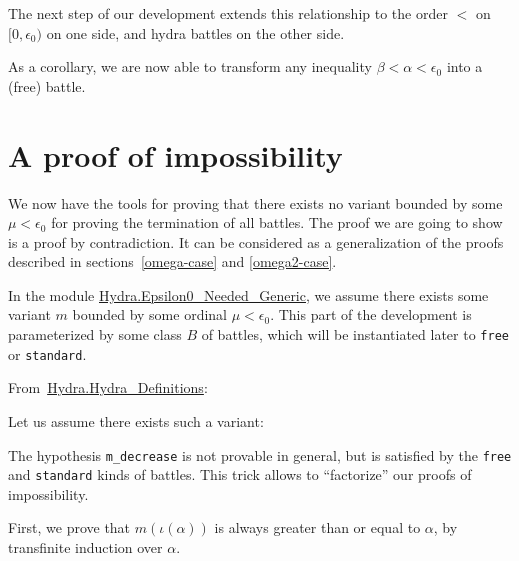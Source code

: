 

The next step of our development extends this relationship to
the order $<$ on $[0,\epsilon_0)$ on one side, and hydra battles on the other side.



As a corollary, we are now able to transform any inequality $\beta<\alpha<\epsilon_0$ into a (free) battle.




\section{A  proof of impossibility}

We now have  the tools for proving that  there exists no variant bounded by some $\mu<\epsilon_0$ for proving the termination   of all battles. The proof we are going to show is a proof by contradiction. It  can
 be considered as a generalization of the
proofs described in  sections~\vref{omega-case} and \vref{omega2-case}.



In the module
\href{../theories/html/hydras.Hydra.Epsilon0_Needed_Generic.html}{Hydra.Epsilon0\_Needed\_Generic}, we assume there exists some variant $m$ bounded by some ordinal $\mu<\epsilon_0$. This part of the development is parameterized by some class $B$ of battles, which will be instantiated later to \texttt{free} or \texttt{standard}.

\vspace{4pt}
\noindent
From~\href{../theories/html/hydras.Hydra.~Hydra_Definitions.html}{Hydra.Hydra\_Definitions}:



Let us assume there exists such a variant:



\label{remark:m-decrease}
\begin{remark}
  The hypothesis \texttt{m\_decrease} is not provable  in general, but is satisfied by
the  \texttt{free} and \texttt{standard} kinds of battles. This trick allows to 
``factorize'' our proofs  of impossibility.
\end{remark}


First, we prove that $m(\iota(\alpha))$ is always greater than or equal to $\alpha$, by  transfinite induction over $\alpha$.


